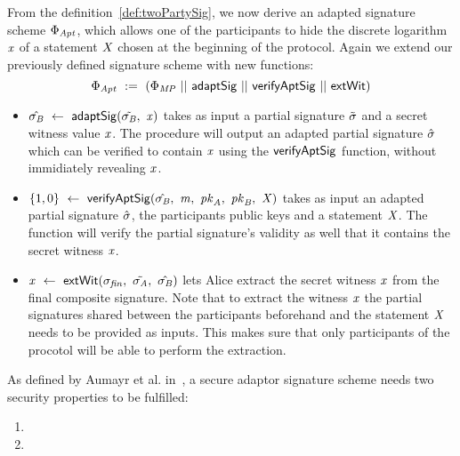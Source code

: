 \begin{definition}
    \label{def:twoPartyFixedWitAptSig}
    From the definition~\ref{def:twoPartySig}, we now derive an adapted signature scheme $\Phi_{\mathit{Apt}}$, which allows one of the participants to hide the discrete logarithm $\mathit{x}$ of a statement $\mathit{X}$ chosen
    at the beginning of the protocol. Again we extend our previously defined signature scheme with new functions:
    \[ \Phi_{\mathit{Apt}} ~:=~ (\Phi_{\mathit{MP}} ~||~ \mathsf{adaptSig} ~||~ \mathsf{verifyAptSig} ~||~ \mathsf{extWit}) \]
    
    \begin{itemize}
        \item $\hat{\sigma_{\mathit{B}}} ~\leftarrow~ \mathsf{adaptSig}(\tilde{\sigma_{\mathit{B}}} ,~ \mathit{x})$ takes as input a partial signature $\tilde{\sigma}$ and a secret witness value $\mathit{x}$. The procedure will output an adapted partial signature $\hat{\sigma}$ which can be verified to contain $\mathit{x}$ using the $\mathsf{verifyAptSig}$ function, without immidiately revealing $\mathit{x}$.
        \item $\{1,0\} ~\leftarrow~ \mathsf{verifyAptSig}(\hat{\sigma_{\mathit{B}}} ,~ \mathit{m} ,~ \mathit{pk}_{\mathit{A}} ,~ \mathit{pk}_{\mathit{B}} ,~ \mathit{X})$ takes as input an adapted partial signature $\hat{\sigma}$, the participants public keys and a statement $\mathit{X}$. The function will verify the partial signature's validity as well that it contains the secret witness $\mathit{x}$.
        \item $\mathit{x} ~\leftarrow~ \mathsf{extWit}(\sigma_{\mathit{fin}} ,~ \tilde{\sigma_{\mathit{A}}} ,~ \hat{\sigma_{\mathit{B}}})$ lets Alice extract the secret witness $\mathit{x}$ from the final composite signature. Note that to extract the witness $\mathit{x}$ the partial signatures shared between the participants beforehand and the statement $\mathit{X}$ needs to be provided as inputs. This makes sure that only participants of the procotol will be able to perform the extraction.
    \end{itemize}
\end{definition}

\begin{definition}[\cnstSecureAptScheme]\label{def:aptsigsecure}
    As defined by Aumayr et al. in~\cite{aumayr2020bitcoinchannels}, a secure adaptor signature scheme needs two security properties to be fulfilled:
    \begin{enumerate}
        \item \cnstaEUFCMA
        \item \cnstWitnessExtractability
    \end{enumerate}
\end{definition}

